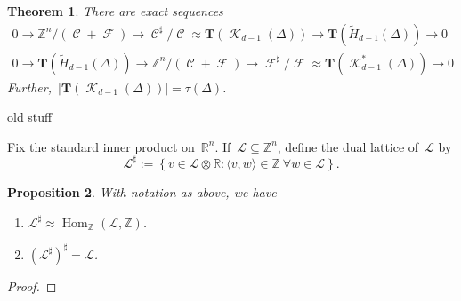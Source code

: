 \documentclass[12pt]{article}
\newcommand{\Z}{\mathbb{Z}}
\newcommand{\R}{\mathbb{R}}
\newcommand{\T}{\mathbf{T}}
\newcommand{\tH}{\widetilde{H}}
\DeclareMathOperator{\Hom}{\mathrm{Hom}}
\DeclareMathOperator{\cut}{\mathcal{C}}
\DeclareMathOperator{\flow}{\mathcal{F}}
\DeclareMathOperator{\crit}{\mathcal{K}}
\newtheorem{theorem}{Theorem}[section]
\newtheorem{prop}[theorem]{Proposition}
\theoremstyle{definition}
\theoremstyle{remark}
\begin{document}
\begin{theorem}\label{thm: cut flow sequences}
  There are exact sequences
  \begin{align*}
    0\to\Z^n/(\cut+\flow)\to\cut^{\sharp}/\cut\approx\T(\crit_{d-1}(\Delta))\to\T(\tH_{d-1}(\Delta))\to0\\[8pt]
    0\to\T(\tH_{d-1}(\Delta))\to\Z^n/(\cut+\flow)\to\flow^{\sharp}/\flow\approx\T(\crit^*_{d-1}(\Delta))\to0
  \end{align*}
  Further,~$|\T(\crit_{d-1}(\Delta))|=\tau(\Delta)$.
\end{theorem}

\centerline{\sc old stuff}
\medskip

Fix the standard inner product on~$\R^n$.  If~$\mathcal{L}\subseteq\Z^n$, define
the dual lattice of~$\mathcal{L}$ by
\[
  \mathcal{L}^{\sharp}:=\left\{ v\in\mathcal{L}\otimes\R:\langle
  v,w\rangle\in\Z\ \forall w\in\mathcal{L} \right\}.
\]
\begin{prop} With notation as above, we have
  \begin{enumerate}
    \item $\mathcal{L}^{\sharp}\approx\Hom_{\Z}(\mathcal{L},\Z)$.
    \item $(\mathcal{L}^{\sharp})^{\sharp}=\mathcal{L}$.
  \end{enumerate}
\end{prop}
\begin{proof}
\end{proof}
\end{document}
